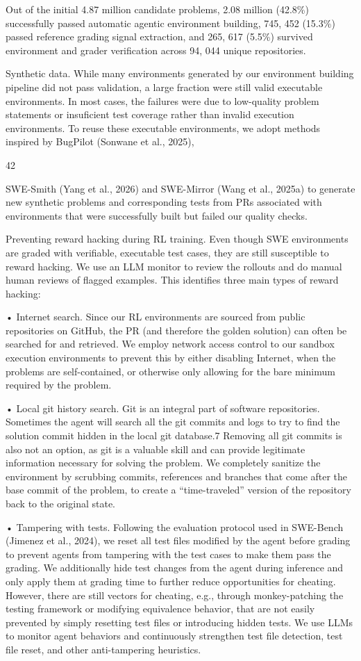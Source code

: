 \documentclass[
  10
]{article}
\begin{document}
Out of the initial 4.87 million candidate problems, 2.08 million
(42.8\%) successfully passed automatic agentic environment building,
745, 452 (15.3\%) passed reference grading signal extraction, and 265,
617 (5.5\%) survived environment and grader verification across 94, 044
unique repositories.

Synthetic data. While many environments generated by our environment
building pipeline did not pass validation, a large fraction were still
valid executable environments. In most cases, the failures were due to
low-quality problem statements or insuficient test coverage rather than
invalid execution environments. To reuse these executable environments,
we adopt methods inspired by BugPilot (Sonwane et al., 2025),

42

SWE-Smith (Yang et al., 2026) and SWE-Mirror (Wang et al., 2025a) to
generate new synthetic problems and corresponding tests from PRs
associated with environments that were successfully built but failed our
quality checks.

Preventing reward hacking during RL training. Even though SWE
environments are graded with verifiable, executable test cases, they are
still susceptible to reward hacking. We use an LLM monitor to review the
rollouts and do manual human reviews of flagged examples. This
identifies three main types of reward hacking:

• Internet search. Since our RL environments are sourced from public
repositories on GitHub, the PR (and therefore the golden solution) can
often be searched for and retrieved. We employ network access control to
our sandbox execution environments to prevent this by either disabling
Internet, when the problems are self-contained, or otherwise only
allowing for the bare minimum required by the problem.

• Local git history search. Git is an integral part of software
repositories. Sometimes the agent will search all the git commits and
logs to try to find the solution commit hidden in the local git
database.7 Removing all git commits is also not an option, as git is a
valuable skill and can provide legitimate information necessary for
solving the problem. We completely sanitize the environment by scrubbing
commits, references and branches that come after the base commit of the
problem, to create a ``time-traveled'' version of the repository back to
the original state.

• Tampering with tests. Following the evaluation protocol used in
SWE-Bench (Jimenez et al., 2024), we reset all test files modified by
the agent before grading to prevent agents from tampering with the test
cases to make them pass the grading. We additionally hide test changes
from the agent during inference and only apply them at grading time to
further reduce opportunities for cheating. However, there are still
vectors for cheating, e.g., through monkey-patching the testing
framework or modifying equivalence behavior, that are not easily
prevented by simply resetting test files or introducing hidden tests. We
use LLMs to monitor agent behaviors and continuously strengthen test
file detection, test file reset, and other anti-tampering heuristics.
\end{document}
